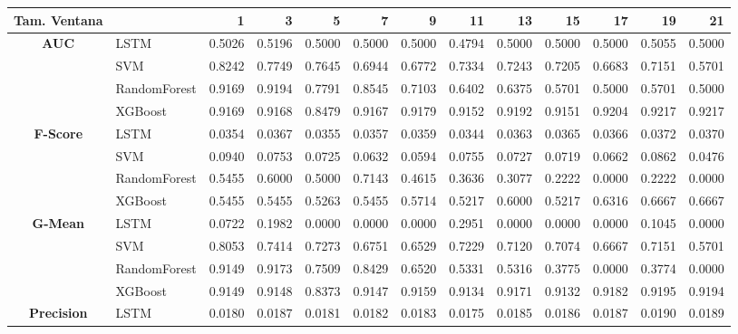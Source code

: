 \begin{table}[H]
	\centering
	\begin{adjustbox}{max width=12cm}
		\begin{tabular}{|c|l|r|r|r|r|r|r|r|r|r|r|r|}
			\hline
			\textbf{Tam. Ventana} &         &      1  &      3  &      5  &      7  &      9  &      11 &      13 &      15 &      17 &      19 &      21 \\
			\hline
			\textbf{AUC} & LSTM &  0.5026 &  0.5196 &  0.5000 &  0.5000 &  0.5000 &  0.4794 &  0.5000 &  0.5000 &  0.5000 &  0.5055 &  0.5000 \\
			& SVM &  0.8242 &  0.7749 &  0.7645 &  0.6944 &  0.6772 &  0.7334 &  0.7243 &  0.7205 &  0.6683 &  0.7151 &  0.5701 \\
			& RandomForest &  0.9169 &  0.9194 &  0.7791 &  0.8545 &  0.7103 &  0.6402 &  0.6375 &  0.5701 &  0.5000 &  0.5701 &  0.5000 \\
			& XGBoost &  0.9169 &  0.9168 &  0.8479 &  0.9167 &  0.9179 &  0.9152 &  0.9192 &  0.9151 &  0.9204 &  0.9217 &  0.9217 \\
			\hline
			\textbf{F-Score} & LSTM &  0.0354 &  0.0367 &  0.0355 &  0.0357 &  0.0359 &  0.0344 &  0.0363 &  0.0365 &  0.0366 &  0.0372 &  0.0370 \\
			& SVM &  0.0940 &  0.0753 &  0.0725 &  0.0632 &  0.0594 &  0.0755 &  0.0727 &  0.0719 &  0.0662 &  0.0862 &  0.0476 \\
			& RandomForest &  0.5455 &  0.6000 &  0.5000 &  0.7143 &  0.4615 &  0.3636 &  0.3077 &  0.2222 &  0.0000 &  0.2222 &  0.0000 \\
			& XGBoost &  0.5455 &  0.5455 &  0.5263 &  0.5455 &  0.5714 &  0.5217 &  0.6000 &  0.5217 &  0.6316 &  0.6667 &  0.6667 \\
			\hline
			\textbf{G-Mean} & LSTM &  0.0722 &  0.1982 &  0.0000 &  0.0000 &  0.0000 &  0.2951 &  0.0000 &  0.0000 &  0.0000 &  0.1045 &  0.0000 \\
			& SVM &  0.8053 &  0.7414 &  0.7273 &  0.6751 &  0.6529 &  0.7229 &  0.7120 &  0.7074 &  0.6667 &  0.7151 &  0.5701 \\
			& RandomForest &  0.9149 &  0.9173 &  0.7509 &  0.8429 &  0.6520 &  0.5331 &  0.5316 &  0.3775 &  0.0000 &  0.3774 &  0.0000 \\
			& XGBoost &  0.9149 &  0.9148 &  0.8373 &  0.9147 &  0.9159 &  0.9134 &  0.9171 &  0.9132 &  0.9182 &  0.9195 &  0.9194 \\
			\hline
			\textbf{Precision} & LSTM &  0.0180 &  0.0187 &  0.0181 &  0.0182 &  0.0183 &  0.0175 &  0.0185 &  0.0186 &  0.0187 &  0.0190 &  0.0189 \\

\end{tabular}
\end{adjustbox}
\end{table}
